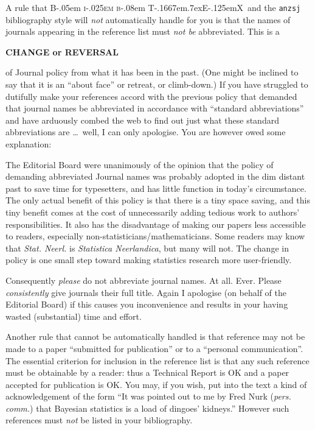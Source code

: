 \documentclass[
doublespace,
  times]{anzsauth}
\newcommand\BibTeX{{\rmfamily B\kern-.05em \textsc{i\kern-.025em b}\kern-.08em
T\kern-.1667em\lower.7ex\hbox{E}\kern-.125emX}}
\begin{document}
A rule that \BibTeX~and the \texttt{anzsj} bibliography style will
\emph{not} automatically handle for you is that the names of journals
appearing in the reference list must \emph{not be} abbreviated. This is
a

\begin{center}
{\large \textbf{CHANGE or REVERSAL}}
\end{center}

of Journal policy from what it has been in the past. (One might be
inclined to say that it is an ``about face'' or retreat, or climb-down.)
If you have struggled to dutifully make your references accord with the
previous policy that demanded that journal names be abbreviated in
accordance with ``standard abbreviations'' and have arduously combed the
web to find out just what these standard abbreviations are \ldots~well,
I can only apologise. You are however owed some explanation:

The Editorial Board were unanimously of the opinion that the policy of
demanding abbreviated Journal names was probably adopted in the dim
distant past to save time for typesetters, and has little function in
today's circumstance. The only actual benefit of this policy is that
there is a tiny space saving, and this tiny benefit comes at the cost of
unnecessarily adding tedious work to authors' responsibilities. It also
has the disadvantage of making our papers less accessible to readers,
especially non-statisticians/mathematicians. Some readers may know that
\emph{Stat. Neerl.} is \emph{Statistica Neerlandica}, but many will not.
The change in policy is one small step toward making statistics research
more user-friendly.

Consequently \emph{please} do not abbreviate journal names. At all.
Ever. Please \emph{consistently} give journals their full title. Again I
apologise (on behalf of the Editorial Board) if this causes you
inconvenience and results in your having wasted (substantial) time and
effort.

Another rule that cannot be automatically handled is that reference may
not be made to a paper ``submitted for publication'' or to a ``personal
communication''. The essential criterion for inclusion in the reference
list is that any such reference must be obtainable by a reader: thus a
Technical Report is OK and a paper accepted for publication is OK. You
may, if you wish, put into the text a kind of acknowledgement of the
form ``It was pointed out to me by Fred Nurk (\emph{pers. comm.}) that
Bayesian statistics is a load of dingoes' kidneys.'' However such
references must \emph{not} be listed in your bibliography.
\end{document}
